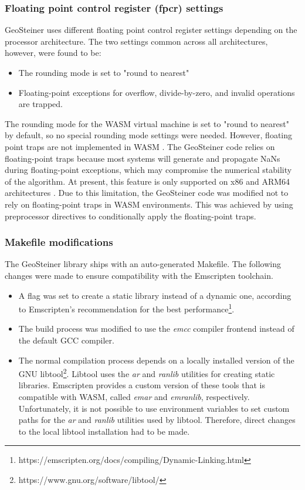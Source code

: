 \documentclass{l4proj}
\begin{document}
\subsubsection{Floating point control register (fpcr) settings}
GeoSteiner uses different floating point control register settings depending on the processor architecture. The two settings common across all architectures, however, were found to be:
\begin{itemize}
    \item The rounding mode is set to "round to nearest"
    \item Floating-point exceptions for overflow, divide-by-zero, and invalid operations are trapped.
\end{itemize}

The rounding mode for the WASM virtual machine is set to "round to nearest" by default, so no special rounding mode settings were needed. However, floating point traps are not implemented in WASM \citep{WASM_faqs}. The GeoSteiner code relies on floating-point traps because most systems will generate and propagate NaNs during floating-point exceptions, which may compromise the numerical stability of the algorithm. At present, this feature is only supported on x86 and ARM64 architectures \citep{Geosteiner_manual}.
Due to this limitation, the GeoSteiner code was modified not to rely on floating-point traps in WASM environments. This was achieved by using preprocessor directives to conditionally apply the floating-point traps.

\subsubsection{Makefile modifications}
The GeoSteiner library ships with an auto-generated Makefile. The following changes were made to ensure compatibility with the Emscripten toolchain.
\begin{itemize}
    \item A flag was set to create a static library instead of a dynamic one, according to Emscripten's recommendation for the best performance\footnote{https://emscripten.org/docs/compiling/Dynamic-Linking.html}.
    \item The build process was modified to use the \textit{emcc} compiler frontend instead of the default GCC compiler.
    \item The normal compilation process depends on a locally installed version of the GNU libtool\footnote{https://www.gnu.org/software/libtool/}. Libtool uses the \textit{ar} and \textit{ranlib} utilities for creating static libraries. Emscripten provides a custom version of these tools that is compatible with WASM, called \textit{emar} and \textit{emranlib}, respectively. Unfortunately, it is not possible to use environment variables to set custom paths for the \textit{ar} and \textit{ranlib} utilities used by libtool. Therefore, direct changes to the local libtool installation had to be made.
\end{itemize}
\end{document}
